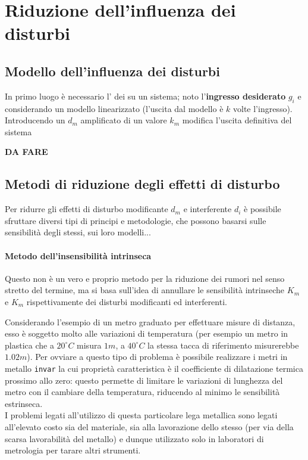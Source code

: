 \chapter{Riduzione dell'influenza dei disturbi}
\section{Modello dell'influenza dei disturbi}
	In primo luogo è necessario  l' dei  su un sistema; noto l'\textbf{ingresso desiderato} $g_i$ e considerando un modello linearizzato (l'uscita dal modello è $k$ volte l'ingresso). Introducendo un  $d_m$ amplificato di un valore $k_m$ modifica l'uscita definitiva del sistema
	
	\textbf{DA FARE}
	
\section{Metodi di riduzione degli effetti di disturbo}
	Per ridurre gli effetti di disturbo modificante $d_m$ e interferente $d_i$ è possibile sfruttare diversi tipi di principi e metodologie, che possono basarsi sulle sensibilità degli stessi, sui loro modelli...
	
	\subsubsection{Metodo dell'insensibilità intrinseca}
		Questo non è un vero e proprio metodo per la riduzione dei rumori nel senso stretto del termine, ma si basa sull'idea di annullare le sensibilità intrinseche $K_m$ e $K_m$ rispettivamente dei disturbi modificanti ed interferenti.
		
		Considerando l'esempio di un metro graduato per effettuare misure di distanza, esso è soggetto molto alle variazioni di temperatura (per esempio un metro in plastica che a $20^\circ C$ misura $1m$, a $40^\circ C$ la stessa tacca di riferimento misurerebbe $1.02m$). Per ovviare a questo tipo di problema è possibile realizzare i metri in metallo \texttt{invar} la cui proprietà caratteristica è il coefficiente di dilatazione termica prossimo allo zero: questo permette di limitare le variazioni di lunghezza del metro con il cambiare della temperatura, riducendo al minimo le sensibilità estrinseca. \\ I problemi legati all'utilizzo di questa particolare lega metallica sono legati all'elevato costo sia del materiale, sia alla lavorazione dello stesso (per via della scarsa lavorabilità del metallo) e dunque utilizzato solo in laboratori di metrologia per tarare altri strumenti.
		
